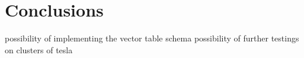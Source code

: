 \chapter{Conclusions}\label{sec:conclusions}
possibility of implementing the vector table schema
possibility of further testings on clusters of tesla

